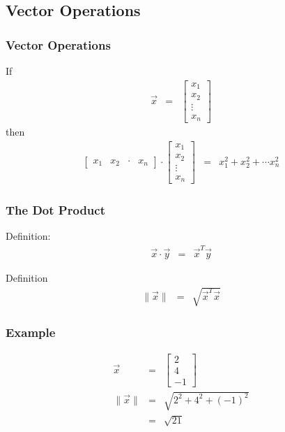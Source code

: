 \subsection{Vector Operations}

\begin{frame}
  \frametitle{Vector Operations}

  If
  \begin{eqnarray*}
    \vec{x} & = & 
    \left[
    \begin{array}{r}
      x_1 \\ x_2 \\ \vdots \\ x_n
    \end{array}
    \right]
  \end{eqnarray*}
  then
  \begin{eqnarray*}
    \left[
      \begin{array}{rrrr}
        x_1 & x_2 & \cdot & x_n
      \end{array}
    \right] \cdot
    \left[
      \begin{array}{r}
        x_1 \\ x_2 \\ \vdots \\ x_n
      \end{array}
    \right] & = & 
    x_1^2 + x_2^2 + \cdots x_n^2
  \end{eqnarray*}

\end{frame}


\begin{frame}
  \frametitle{The Dot Product}

  Definition:
  \begin{eqnarray*}
    \vec{x} \cdot \vec{y} & = & \vec{x}^T \vec{y} 
  \end{eqnarray*}

  Definition
  \begin{eqnarray*}
    \| \vec{x} \| & = & \sqrt{\vec{x}^T \vec{x}}
  \end{eqnarray*}

\end{frame}


\begin{frame}
  \frametitle{Example}

  \begin{eqnarray*}
    \vec{x} & = & 
    \left[
      \begin{array}{r}
        2 \\ 4 \\ -1
      \end{array} \right] \\
      \| \vec{x} \| & = & \sqrt{2^2 + 4^2 + (-1)^2} \\
      & = & \sqrt{21}
  \end{eqnarray*}

\end{frame}

